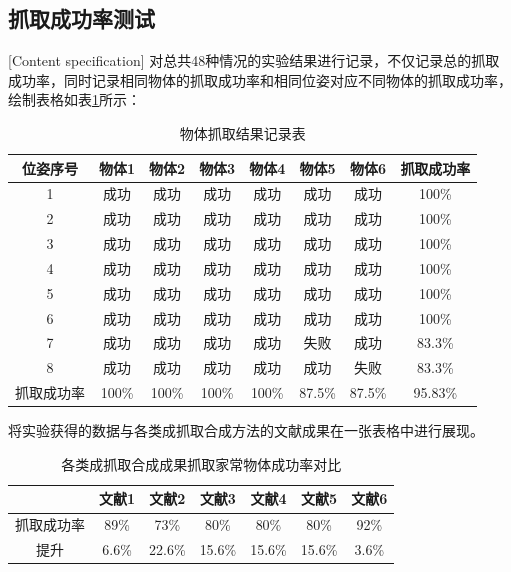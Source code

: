 \documentclass[fontset=fandol,type=bachelor,campus=harbin,bsmainpagenumberline=true]{hithesisbook}
\begin{document}
\subsection{抓取成功率测试}[Content specification]
对总共48种情况的实验结果进行记录，不仅记录总的抓取成功率，同时记录相同物体的抓取成功率和相同位姿对应不同物体的抓取成功率，绘制表格如表\ref{物体抓取结果记录表}所示：
\begin{table}[htbp]
\caption{物体抓取结果记录表}
\label{物体抓取结果记录表}
\vspace{0.5em}\centering\wuhao
\begin{tabular}{cccccccc}
\toprule[1.5pt]
位姿序号 & 物体1 & 物体2 & 物体3 & 物体4 & 物体5 & 物体6 & 抓取成功率\\
\midrule[1pt]
 1 & 成功 & 成功 & 成功 & 成功 & 成功 & 成功 & 100\%\\
 2 & 成功 & 成功 & 成功 & 成功 & 成功 & 成功 & 100\%\\
 3 & 成功 & 成功 & 成功 & 成功 & 成功 & 成功 & 100\%\\
 4 & 成功 & 成功 & 成功 & 成功 & 成功 & 成功 & 100\%\\
 5 & 成功 & 成功 & 成功 & 成功 & 成功 & 成功 & 100\%\\
 6 & 成功 & 成功 & 成功 & 成功 & 成功 & 成功 & 100\%\\
 7 & 成功 & 成功 & 成功 & 成功 & 失败 & 成功 & 83.3\%\\
 8 & 成功 & 成功 & 成功 & 成功 & 成功 & 失败 & 83.3\%\\

\bottomrule[1.5pt]
抓取成功率 & 100\% & 100\% & 100\% & 100\% & 87.5\% & 87.5\% & {\color{red}95.83\%}\\
\hline
\end{tabular}
\end{table}


将实验获得的数据与各类成抓取合成方法的文献成果在一张表格中进行展现。
\begin{table}[htbp]
\caption{各类成抓取合成成果抓取家常物体成功率对比}
\label{各类成抓取合成成果抓取家常物体成功率对比}
\vspace{0.5em}\centering\wuhao
\begin{tabular}{ccccccc}
\toprule[1.5pt]
   & 文献1\cite{lenz2015deep} & 文献2\cite{pinto2016supersizing} & 文献3\cite{johns2016deep} & 文献4\cite{mahler2017dex} & 文献5\cite{levine2018learning} & 文献6\cite{haviland2020control}\\
\midrule[1pt]
 抓取成功率 & 89\% & 73\% & 80\% & 80\% & 80\% & 92\% \\
 提升 & 6.6\% & 22.6\% & 15.6\% & 15.6\% & 15.6\% & 3.6\% \\

\bottomrule[1.5pt]
\end{tabular}
\end{table}
\end{document}
